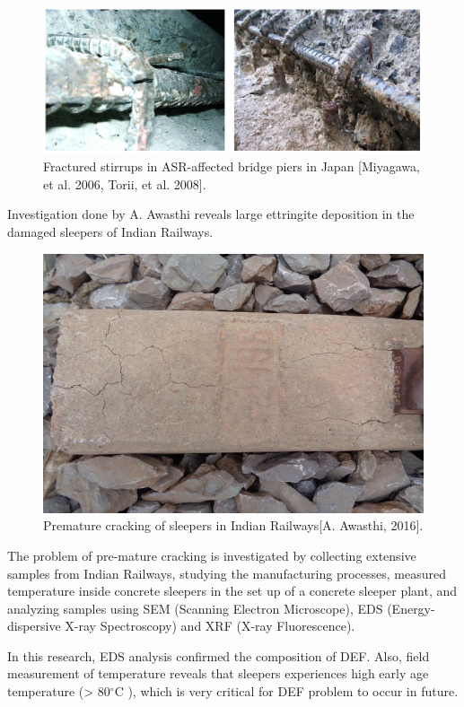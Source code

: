     \begin{figure}[ht!]
        \centering
        \includegraphics[width=.9\linewidth]{Files/Background/Miyagawa.png}
        \caption{Fractured stirrups in ASR-affected bridge piers in Japan [Miyagawa, et al. 2006, Torii, et al. 2008].}
        \label{fig:Miyagawa}
    \end{figure}



Investigation done by A. Awasthi\cite{Awasthi} reveals large ettringite deposition in the damaged sleepers of Indian Railways.

    \begin{figure}[ht!]
        \centering
        \includegraphics[width=.4\linewidth]{Files/Background/Anupam_1.png}
        \caption{Premature cracking of sleepers in Indian Railways[A. Awasthi, 2016].}
        \label{fig:Awasthi_1}
    \end{figure}

The problem of pre-mature cracking is investigated by collecting extensive samples from Indian Railways, studying the manufacturing processes, measured temperature inside concrete sleepers in the set up of a concrete sleeper plant, and analyzing samples using SEM (Scanning Electron Microscope), EDS (Energy-dispersive X-ray Spectroscopy) and XRF (X-ray Fluorescence).

In this research, EDS analysis confirmed the composition of DEF. Also, field measurement of temperature reveals that sleepers experiences high early age temperature (> 80$^\circ$C ), which is very critical for DEF problem to occur in future.

